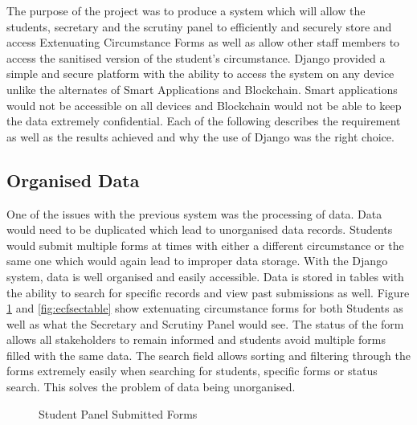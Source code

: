 \documentclass[../main.tex]{subfiles}
\begin{document}
\raggedright
The purpose of the project was to produce a system which will allow the students, secretary and the scrutiny panel to efficiently and securely store and access Extenuating Circumstance Forms as well as allow other staff members to access the sanitised version of the student's circumstance. Django provided a simple and secure platform with the ability to access the system on any device unlike the alternates of Smart Applications and Blockchain. Smart applications would not be accessible on all devices and Blockchain would not be able to keep the data extremely confidential. Each of the following describes the requirement as well as the results achieved and why the use of Django was the right choice. 
     
\subsection*{Organised Data}
One of the issues with the previous system was the processing of data. Data would need to be duplicated which lead to unorganised data records. Students would submit multiple forms at times with either a different circumstance or the same one which would again lead to improper data storage. With the Django system, data is well organised and easily accessible. Data is stored in tables with the ability to search for specific records and view past submissions as well.  Figure \ref{fig:ecfstudenttable} and \ref{fig:ecfsectable} show extenuating circumstance forms for both Students as well as what the Secretary and Scrutiny Panel would see. The status of the form allows all stakeholders to remain informed and students avoid multiple forms filled with the same data. The search field allows sorting and filtering through the forms extremely easily when searching for students, specific forms or status search. This solves the problem of data being unorganised. 

\begin{figure}[H]
        \caption{\label{fig:ecfstudenttable} Student Panel Submitted Forms}
      \end{figure}
 
\end{document}
